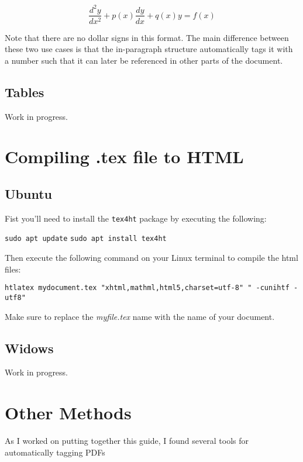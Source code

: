 \documentclass[lang=en]{article}
\newcommand{\code}[1]{\colorbox{light-gray}{\texttt{#1}}}
\begin{document}
\begin{equation}
  \frac{d^2y}{dx^2} + p(x) \frac{dy}{dx} + q(x)y = f(x)
\end{equation}

Note that there are no dollar signs in this format. The main difference between
these two use cases is that the in-paragraph structure automatically tags it
with a number such that it can later be referenced in other parts of the
document.


\subsection{Tables}

Work in progress.


\section{Compiling .tex file to HTML}
\label{sec:Compiling .tex file to HTML}

\subsection{Ubuntu}

Fist you'll need to install the \code{tex4ht} package by executing the
following:

  \code{sudo apt update}
  \code{sudo apt install tex4ht}

Then execute the following command on your Linux terminal to compile the html
files:

  \code{htlatex mydocument.tex "xhtml,mathml,html5,charset=utf-8" " -cunihtf -utf8"}

Make sure to replace the \textit{myfile.tex} name with the name of your
document.


\subsection{Widows}

Work in progress.


\section{Other Methods}

As I worked on putting together this guide, I found several tools for
automatically tagging PDFs







\end{document}
